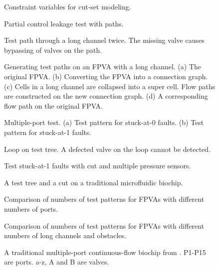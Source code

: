 \begin{figure}[t]\caption{Constraint variables for cut-set modeling.}\end{figure}


\begin{figure}[t]\caption{Partial control leakage test with paths.}\end{figure}


\begin{figure}[t]\caption{Test path through a long channel twice. The missing valve causes bypassing of valves on the path. }\end{figure}


\begin{figure}[t]\caption{Generating test paths on an FPVA with a long channel. (a) The original FPVA. (b) Converting the FPVA into a connection graph. (c) Cells in a long channel are collapsed into a super cell. Flow paths are constructed on the new connection graph. (d) A corresponding flow path on the original FPVA.}\end{figure}


\begin{figure}[t]\caption{Multiple-port test. (a) Test pattern for stuck-at-0 faults. (b) Test pattern for stuck-at-1 faults.}\end{figure}


\begin{figure}[t]\caption{Loop on test tree. A defected valve on the loop cannot be detected.}\end{figure}


\begin{figure}[t]\caption{Test stuck-at-1 faults with cut and multiple pressure sensors.}\end{figure}


\begin{figure}[t]\caption{A test tree and a cut on a traditional microfluidic biochip.}\end{figure}


\begin{figure}[t]\caption{Comparison of numbers of test patterns for FPVAs with different numbers of ports.}\end{figure}


\begin{figure}[t]\caption{Comparison of numbers of test patterns for FPVAs with different numbers of long channels and obstacles.}\end{figure}


\begin{figure}[t]\caption{A traditional multiple-port continuous-flow biochip from \cite{HuYHC14}. P1-P15 are ports. a-z, A and B are valves.}\end{figure}


